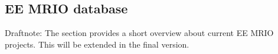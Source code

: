 \subsection{EE MRIO database}

Draftnote: The section provides a short overview about current EE MRIO
projects. This will be extended in the final version.